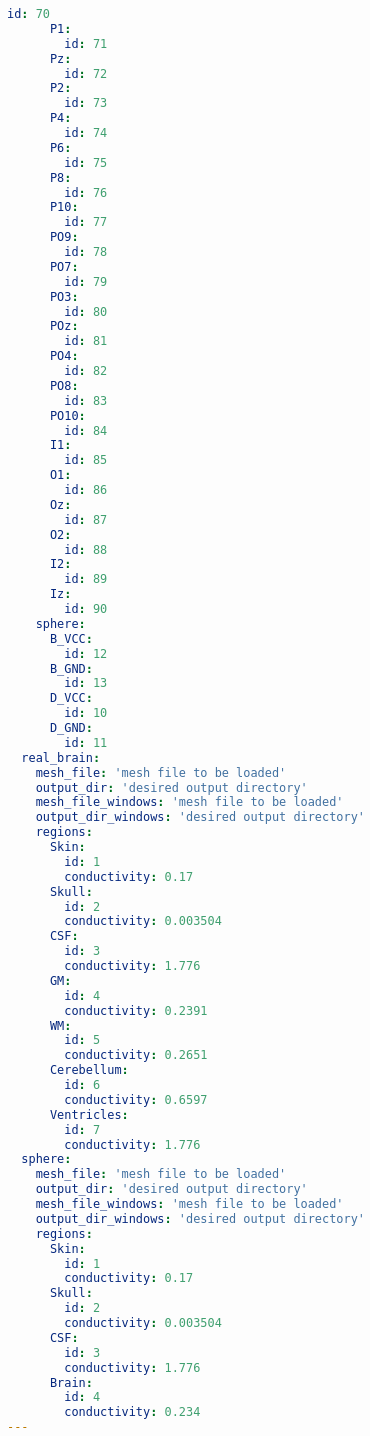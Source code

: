\begin{lstlisting}[language=yaml,caption={Sample settings file},captionpos=b,label=lst:settings_file]
        id: 70
      P1:     
        id: 71
      Pz:     
        id: 72
      P2:     
        id: 73
      P4:     
        id: 74
      P6:     
        id: 75
      P8:     
        id: 76
      P10:    
        id: 77
      PO9:    
        id: 78
      PO7:    
        id: 79
      PO3:    
        id: 80
      POz:    
        id: 81
      PO4:    
        id: 82
      PO8:    
        id: 83
      PO10:   
        id: 84
      I1:     
        id: 85
      O1:     
        id: 86
      Oz:     
        id: 87
      O2:     
        id: 88
      I2:     
        id: 89
      Iz:     
        id: 90
    sphere:
      B_VCC: 
        id: 12
      B_GND: 
        id: 13
      D_VCC: 
        id: 10
      D_GND: 
        id: 11
  real_brain:
    mesh_file: 'mesh file to be loaded'
    output_dir: 'desired output directory'
    mesh_file_windows: 'mesh file to be loaded'
    output_dir_windows: 'desired output directory'
    regions:
      Skin:
        id: 1
        conductivity: 0.17
      Skull:
        id: 2
        conductivity: 0.003504
      CSF:
        id: 3
        conductivity: 1.776
      GM:
        id: 4
        conductivity: 0.2391
      WM:
        id: 5
        conductivity: 0.2651
      Cerebellum:
        id: 6
        conductivity: 0.6597
      Ventricles:
        id: 7
        conductivity: 1.776
  sphere:
    mesh_file: 'mesh file to be loaded'
    output_dir: 'desired output directory'
    mesh_file_windows: 'mesh file to be loaded'
    output_dir_windows: 'desired output directory'
    regions:
      Skin: 
        id: 1
        conductivity: 0.17
      Skull: 
        id: 2
        conductivity: 0.003504
      CSF: 
        id: 3
        conductivity: 1.776
      Brain: 
        id: 4
        conductivity: 0.234
---
\end{lstlisting}